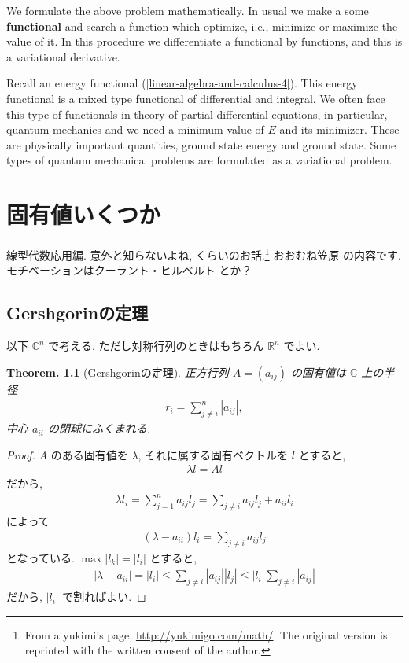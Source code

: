 \documentclass[openany, a4paper, oneside]{jsbook}
\theoremstyle{break}
\newtheorem{thm}{Theorem.}[section]
\theoremstyle{breakdefn}
\newcommand{\abs}[1]{\left|#1\right|}
\newcommand{\rbk}[1]{\left (#1\right)}
\begin{document}
We formulate the above problem mathematically.
In usual we make a some \textbf{functional} and search a function
which optimize, i.e., minimize or maximize the value of it.
In this procedure we differentiate a functional by functions,
and this is a variational derivative.

Recall an energy functional (\ref{linear-algebra-and-calculus-4}).
This energy functional is a mixed type functional of differential and integral.
We often face this type of functionals in theory of partial differential equations,
in particular, quantum mechanics and we need a minimum value of $E$ and its minimizer.
These are physically important quantities, ground state energy and ground state.
Some types of quantum mechanical problems are formulated as a variational problem.
\chapter{固有値いくつか}


線型代数応用編. 意外と知らないよね, くらいのお話.\footnote{From a yukimi's page, \href{http://yukimigo.com/math/}{http://yukimigo.com/math/}.
The original version is reprinted with the written consent of the author.
 }
おおむね笠原 \cite{KoujiKasahara1}の内容です.
モチベーションはクーラント・ヒルベルト \cite{CourantHilbert1}とか？
\section{Gershgorinの定理}


以下 $\mathbb{C}^n$ で考える. ただし対称行列のときはもちろん $\mathbb{R}^n$  でよい.
\begin{thm}[Gershgorinの定理]
 正方行列 $A = (a_{ij})$ の固有値は $\mathbb{C}$ 上の半径
  \begin{align}
   r_i
   =
   \sum_{j\neq i}^n \abs{a_{ij}},
  \end{align}
 中心 $a_{ii}$ の閉球にふくまれる.
\end{thm}

\begin{proof}
$A$ のある固有値を $\lambda$, それに属する固有ベクトルを
$l$ とすると,
\begin{align}
 \lambda l
 =
 Al
\end{align}
だから,
\begin{align}
 \lambda l_i
 =
 \sum_{j=1}^n
 a_{ij} l_j
 =
 \sum_{j \neq i} a_{ij} l_j  + a_{ii} l_i
\end{align}
によって
\begin{align}
 \rbk{\lambda - a_{ii}} l_i
 =
 \sum_{j \neq i} a_{ij} l_j
\end{align}
となっている.
$\max \abs{l_k} = \abs{l_i}$ とすると,
\begin{align}
 \abs{\lambda - a_{ii}}
 =
 \abs{l_i}
 \le
 \sum_{j \neq i} \abs{a_{ij}} \abs{l_j}
 \le
 \abs{l_i} \sum_{j \neq i} \abs{a_{ij}}
\end{align}
だから, $|l_i|$ で割ればよい.
\end{proof}
\end{document}
